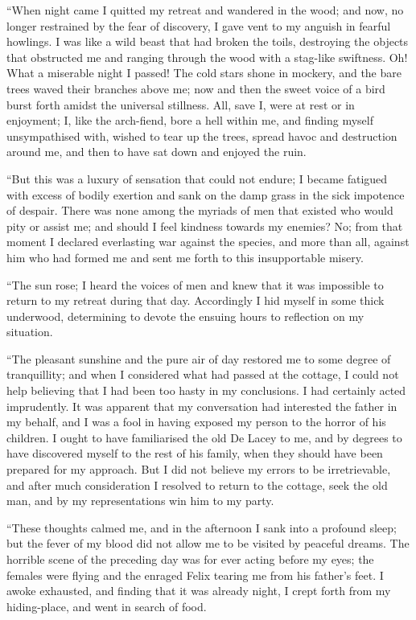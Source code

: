 \documentclass[12pt,openright]{book}
\begin{document}
“When night came I quitted my retreat and wandered in the wood; and now, no longer restrained by the fear of discovery, I gave vent to my anguish in fearful howlings. I was like a wild beast that had broken the toils, destroying the objects that obstructed me and ranging through the wood with a stag-like swiftness. Oh! What a miserable night I passed! The cold stars shone in mockery, and the bare trees waved their branches above me; now and then the sweet voice of a bird burst forth amidst the universal stillness. All, save I, were at rest or in enjoyment; I, like the arch-fiend, bore a hell within me, and finding myself unsympathised with, wished to tear up the trees, spread havoc and destruction around me, and then to have sat down and enjoyed the ruin.

“But this was a luxury of sensation that could not endure; I became fatigued with excess of bodily exertion and sank on the damp grass in the sick impotence of despair. There was none among the myriads of men that existed who would pity or assist me; and should I feel kindness towards my enemies? No; from that moment I declared everlasting war against the species, and more than all, against him who had formed me and sent me forth to this insupportable misery.

“The sun rose; I heard the voices of men and knew that it was impossible to return to my retreat during that day. Accordingly I hid myself in some thick underwood, determining to devote the ensuing hours to reflection on my situation.

“The pleasant sunshine and the pure air of day restored me to some degree of tranquillity; and when I considered what had passed at the cottage, I could not help believing that I had been too hasty in my conclusions. I had certainly acted imprudently. It was apparent that my conversation had interested the father in my behalf, and I was a fool in having exposed my person to the horror of his children. I ought to have familiarised the old De Lacey to me, and by degrees to have discovered myself to the rest of his family, when they should have been prepared for my approach. But I did not believe my errors to be irretrievable, and after much consideration I resolved to return to the cottage, seek the old man, and by my representations win him to my party.

“These thoughts calmed me, and in the afternoon I sank into a profound sleep; but the fever of my blood did not allow me to be visited by peaceful dreams. The horrible scene of the preceding day was for ever acting before my eyes; the females were flying and the enraged Felix tearing me from his father’s feet. I awoke exhausted, and finding that it was already night, I crept forth from my hiding-place, and went in search of food.
\end{document}
